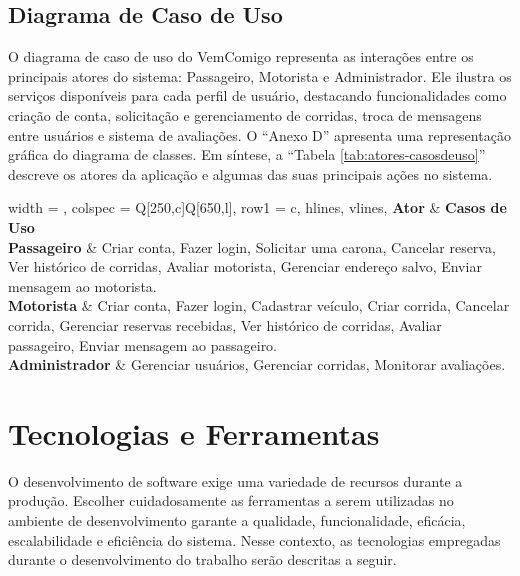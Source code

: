 \subsection{Diagrama de Caso de Uso}

O diagrama de caso de uso do VemComigo representa as interações entre os principais atores do sistema: Passageiro, Motorista e Administrador. Ele ilustra os serviços disponíveis para cada perfil de usuário, destacando funcionalidades como criação de conta, solicitação e gerenciamento de corridas, troca de mensagens entre usuários e sistema de avaliações.  O ``Anexo D'' apresenta uma representação gráfica do diagrama de classes. Em síntese, a ``Tabela \ref{tab:atores-casosdeuso}'' descreve os atores da aplicação e algumas das suas principais ações no sistema.

\begin{longtblr}[
	caption = {Atores e Casos de Uso do Aplicativo},
	label = {tab:atores-casosdeuso},
	entry = none,
	]{
		width = \linewidth,
		colspec = {Q[250,c]Q[650,l]},
		row{1} = {c},
		hlines,
		vlines,
	}
	\textbf{Ator} & \textbf{Casos de Uso} \\
	
	\textbf{Passageiro} & 
	Criar conta, Fazer login, Solicitar uma carona, Cancelar reserva, Ver histórico de corridas, Avaliar motorista, Gerenciar endereço salvo, Enviar mensagem ao motorista. \\
	
	\textbf{Motorista} & 
	Criar conta, Fazer login, Cadastrar veículo, Criar corrida, Cancelar corrida, Gerenciar reservas recebidas, Ver histórico de corridas, Avaliar passageiro, Enviar mensagem ao passageiro. \\
	
	\textbf{Administrador} & 
	Gerenciar usuários, Gerenciar corridas, Monitorar avaliações. \\
	
\end{longtblr}



\section{Tecnologias e Ferramentas}

O desenvolvimento de software exige uma variedade de recursos durante a produção. Escolher cuidadosamente as ferramentas a serem utilizadas no ambiente de desenvolvimento garante a qualidade, funcionalidade, eficácia, escalabilidade e eficiência do sistema. Nesse contexto, as tecnologias empregadas durante o desenvolvimento do trabalho serão descritas a seguir. 

